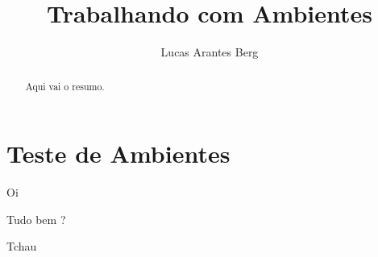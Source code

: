 \documentclass[]{article}
\title{Trabalhando com Ambientes}
\author{Lucas Arantes Berg}
\newcommand{\sorria}{\item [\Smiley]}
\newenvironment{lista-feliz}{\begin{itemize}}{\end{itemize}}
\begin{document}
\maketitle

\begin{abstract}
	Aqui vai o resumo.
\end{abstract}

\section{Teste de Ambientes}

\begin{lista-feliz}
	\sorria Oi 
	\sorria Tudo bem ?
	\sorria Tchau
\end{lista-feliz}
\end{document}

